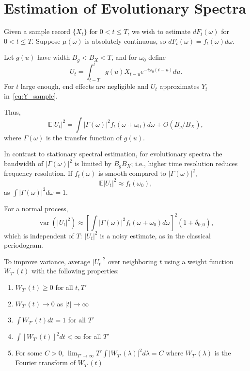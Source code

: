 \documentclass[12pt]{article}
\theoremstyle{definition}
\theoremstyle{plain}
\theoremstyle{remark}
\begin{document}
\section{Estimation of Evolutionary Spectra}
\label{sec:estimation}

Given a sample record $\{X_t\}$ for $0 < t \leq T$, we wish to estimate $dF_t(\omega)$ for $0 < t \leq T$. Suppose $\mu(\omega)$ is absolutely continuous, so $dF_t(\omega) = f_t(\omega) d\omega$.

Let $g(u)$ have width $B_g < B_X < T$, and for $\omega_0$ define
\begin{equation}
U_t = \int_{t-T}^t g(u) X_{t-u} e^{-i\omega_0 (t-u)} du.
\label{eq:Ut}
\end{equation}
For $t$ large enough, end effects are negligible and $U_t$ approximates $Y_t$ in~\eqref{eq:Y_sample}.

Thus,
\begin{equation}
\mathbb{E}|U_t|^2 = \int |\Gamma(\omega)|^2 f_t(\omega+\omega_0) d\omega + O(B_g/B_X),
\end{equation}
where $\Gamma(\omega)$ is the transfer function of $g(u)$.

In contrast to stationary spectral estimation, for evolutionary spectra the bandwidth of $|\Gamma(\omega)|^2$ is limited by $B_g B_X$; i.e., higher time resolution reduces frequency resolution. If $f_t(\omega)$ is smooth compared to $|\Gamma(\omega)|^2$,
\begin{equation}
\mathbb{E}|U_t|^2 \approx f_t(\omega_0),
\label{eq:Ut_f}
\end{equation}
as $\int |\Gamma(\omega)|^2 d\omega = 1$.

For a normal process,
\begin{equation}
\operatorname{var}(|U_t|^2) \approx [\int |\Gamma(\omega)|^2 f_t(\omega+\omega_0) d\omega]^2 (1 + \delta_{0,0}),
\end{equation}
which is independent of $T$: $|U_t|^2$ is a noisy estimate, as in the classical periodogram.

To improve variance, average $|U_t|^2$ over neighboring $t$ using a weight function $W_{T'}(t)$ with the following properties:
\begin{enumerate}[label=(\alph*)]
    \item $W_{T'}(t) \geq 0$ for all $t, T'$
    \item $W_{T'}(t) \to 0$ as $|t| \to \infty$
    \item $\int W_{T'}(t) dt = 1$ for all $T'$
    \item $\int [W_{T'}(t)]^2 dt < \infty$ for all $T'$
    \item For some $C > 0$, $\lim_{T' \to \infty} T' \int |W_{T'}(\lambda)|^2 d\lambda = C$ where $W_{T'}(\lambda)$ is the Fourier transform of $W_{T'}(t)$
\end{enumerate}
\end{document}
